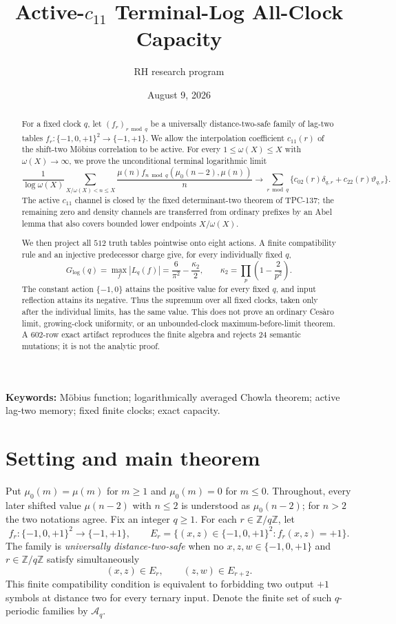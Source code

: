 \documentclass[11pt]{article}
\title{Active-$c_{11}$ Terminal-Log All-Clock Capacity}
\author{RH research program}
\date{August 9, 2026}
\theoremstyle{definition}
\theoremstyle{remark}
\newcommand{\T}{\{-1,0,+1\}}
\newcommand{\mob}{\mu}
\newcommand{\dd}{\delta}
\newcommand{\thh}{\vartheta}
\newcommand{\kap}{\kappa_2}
\newcommand{\Glog}{G_{\log}}
\newcommand{\Zq}{\mathbb Z/q\mathbb Z}
\begin{document}
\maketitle

\begin{abstract}
For a fixed clock $q$, let $(f_r)_{r\bmod q}$ be a universally
distance-two-safe family of lag-two tables
$f_r:\{-1,0,+1\}^2\to\{-1,+1\}$.  We allow the interpolation
coefficient $c_{11}(r)$ of the shift-two M\"obius correlation to be active.
For every $1\le\omega(X)\le X$ with $\omega(X)\to\infty$, we prove the
unconditional terminal logarithmic limit
\[
 \frac1{\log\omega(X)}
 \sum_{X/\omega(X)<n\le X}
 \frac{\mob(n)f_{n\bmod q}(\mob_0(n-2),\mob(n))}{n}
 \longrightarrow
 \sum_{r\bmod q}\{c_{02}(r)\dd_{q,r}+c_{22}(r)\thh_{q,r}\}.
\]
The active $c_{11}$ channel is closed by the fixed determinant-two theorem
of TPC-137; the remaining zero and density channels are transferred from
ordinary prefixes by an Abel lemma that also covers bounded lower endpoints
$X/\omega(X)$.

We then project all $512$ truth tables pointwise onto eight actions.  A
finite compatibility rule and an injective predecessor charge give, for
every individually fixed $q$,
\[
 \Glog(q)=\max_f|L_q(f)|
 =\frac6{\pi^2}-\frac{\kap}{2},
 \qquad \kap=\prod_p\left(1-\frac2{p^2}\right).
\]
The constant action $\{-1,0\}$ attains the positive value for every fixed
$q$, and input reflection attains its negative.  Thus the supremum over all
fixed clocks, taken only after the individual limits, has the same value.
This does not prove an ordinary Ces\`aro limit, growing-clock uniformity, or
an unbounded-clock maximum-before-limit theorem.  A $602$-row exact artifact reproduces the
finite algebra and rejects $24$ semantic mutations; it is not the analytic
proof.
\end{abstract}

\noindent\textbf{Keywords:} M\"obius function; logarithmically averaged
Chowla theorem; active lag-two memory; fixed finite clocks; exact capacity.

\section{Setting and main theorem}

Put $\mob_0(m)=\mob(m)$ for $m\ge1$ and $\mob_0(m)=0$ for $m\le0$.
Throughout, every later shifted value $\mob(n-2)$ with $n\le2$ is understood
as $\mob_0(n-2)$; for $n>2$ the two notations agree.
Fix an integer $q\ge1$.  For each $r\in\Zq$, let
\[
 f_r:\T^2\longrightarrow\{-1,+1\},
 \qquad E_r=\{(x,z)\in\T^2:f_r(x,z)=+1\}.
\]
The family is \emph{universally distance-two-safe} when no
$x,z,w\in\T$ and $r\in\Zq$ satisfy simultaneously
\begin{equation}
 (x,z)\in E_r,
 \qquad (z,w)\in E_{r+2}.
 \label{eq:safety}
\end{equation}
This finite compatibility condition is equivalent to forbidding two output
$+1$ symbols at distance two for every ternary input.  Denote the finite set
of such $q$-periodic families by $\mathcal A_q$.
\end{document}
